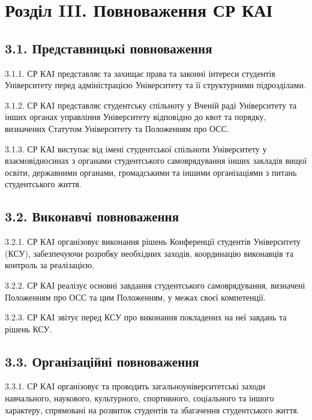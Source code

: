 \section*{Розділ III. Повноваження СР КАІ}

\subsection*{3.1. Представницькі повноваження}
    3.1.1. СР КАІ представляє та захищає права та законні інтереси студентів Університету перед адміністрацією Університету та її структурними підрозділами.

    3.1.2. СР КАІ представляє студентську спільноту у Вченій раді Університету та інших органах управління Університету відповідно до квот та порядку, визначених Статутом Університету та Положенням про ОСС.

    3.1.3. СР КАІ виступає від імені студентської спільноти Університету у взаємовідносинах з органами студентського самоврядування інших закладів вищої освіти, державними органами, громадськими та іншими організаціями з питань студентського життя.

\subsection*{3.2. Виконавчі повноваження}
    3.2.1. СР КАІ організовує виконання рішень Конференції студентів Університету (КСУ), забезпечуючи розробку необхідних заходів, координацію виконавців та контроль за реалізацією.

    3.2.2. СР КАІ реалізує основні завдання студентського самоврядування, визначені Положенням про ОСС та цим Положенням, у межах своєї компетенції.

    3.2.3. СР КАІ звітує перед КСУ про виконання покладених на неї завдань та рішень КСУ.

\subsection*{3.3. Організаційні повноваження}
    3.3.1. СР КАІ організовує та проводить загальноуніверситетські заходи навчального, наукового, культурного, спортивного, соціального та іншого характеру, спрямовані на розвиток студентів та збагачення студентського життя.

